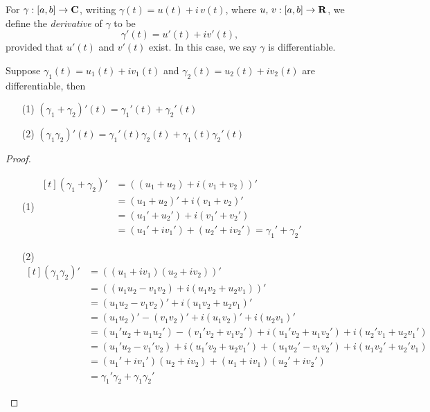 \medskip

\begin{definition}
For $\gamma:[a,b] \to \mathbf C$, writing $\gamma(t) = u(t) + i\,v(t)$, where $u,\,v:[a,b] \to \mathbf R$, we define the \emph{derivative} of $\gamma$ to be
\[\gamma'(t) = u'(t) + iv'(t),\]
provided that $u'(t)$ and $v'(t)$ exist. In this case, we say $\gamma$ is differentiable.
\end{definition}

\medskip

\begin{proposition}
Suppose $\gamma_1(t) = u_1(t) + iv_1(t)$ and $\gamma_2(t) = u_2(t) + iv_2(t)$ are differentiable, then
\begin{itemize}
\item[(1)] $(\gamma_1 + \gamma_2)'(t) = \gamma_1'(t) + \gamma_2'(t)$
\item[(2)] $(\gamma_1\gamma_2)'(t) = \gamma_1'(t)\gamma_2(t) + \gamma_1(t)\gamma_2'(t)$
\end{itemize}
\end{proposition}
\begin{proof}\hfill
\begin{itemize}[itemsep=1em]
\item[(1)] 
$\begin{aligned}[t]
(\gamma_1 + \gamma_2)' &=  ((u_1 + u_2) + i(v_1 + v_2))'\\[0.5em]
&= (u_1 + u_2)' + i(v_1 + v_2)'\\[0.5em]
&= (u_1' + u_2') + i(v_1' + v_2')\\[0.5em]
&= (u_1' + iv_1') + (u_2' + iv_2') = \gamma_1' + \gamma_2'
\end{aligned}$

\item[(2)] 
$\begin{aligned}[t]
(\gamma_1\gamma_2)' &=  ((u_1 + iv_1)(u_2 + iv_2))'\\[0.5em]
&=  ((u_1u_2 - v_1v_2) + i(u_1v_2 + u_2v_1))'\\[0.5em]
&= (u_1u_2 - v_1v_2)' + i(u_1v_2 + u_2v_1)'\\[0.5em]
&= (u_1u_2)' - (v_1v_2)' + i(u_1v_2)' + i(u_2v_1)'\\[0.5em]
&= (u_1'u_2 + u_1u_2') - (v_1'v_2 + v_1v_2') + i(u_1'v_2 + u_1v_2') + i(u_2'v_1 + u_2v_1')\\[0.5em]
&= (u_1'u_2 - v_1'v_2) + i(u_1'v_2 + u_2v_1') + (u_1u_2' - v_1v_2') + i(u_1v_2' + u_2'v_1)\\[0.5em]
&= (u_1' + iv_1')(u_2 + iv_2) + (u_1 + iv_1)(u_2' + iv_2')\\[0.5em]
&= \gamma_1'\gamma_2 + \gamma_1\gamma_2'
\end{aligned}$
\end{itemize}
\vspace*{-\baselineskip}
\end{proof}

